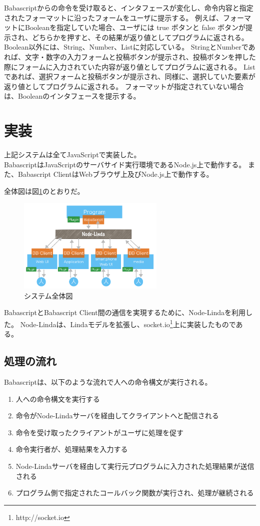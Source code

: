 \documentclass[twoside]{wiss}
\begin{document}
Babascriptからの命令を受け取ると、インタフェースが変化し、命令内容と指定されたフォーマットに沿ったフォームをユーザに提示する。
例えば、フォーマットにBooleanを指定していた場合、ユーザには true ボタンと false ボタンが提示され、どちらかを押すと、その結果が返り値としてプログラムに返される。
Boolean以外には、String、Number、Listに対応している。
StringとNumberであれば、文字・数字の入力フォームと投稿ボタンが提示され、投稿ボタンを押した際にフォームに入力されていた内容が返り値としてプログラムに返される。
Listであれば、選択フォームと投稿ボタンが提示され、同様に、選択していた要素が返り値としてプログラムに返される。
フォーマットが指定されていない場合は、Booleanのインタフェースを提示する。

\section{実装}

上記システムは全てJavaScriptで実装した。\\
BabascriptはJavaScriptのサーバサイド実行環境であるNode.js上で動作する。
また、Babascript ClientはWebブラウザ上及びNode.js上で動作する。

全体図は図\ref{system}のとおりだ。

\begin{figure}[h]
  \includegraphics[width=70mm, bb=0 0 928 599]{./images/system.png}
  \caption{システム全体図}  
  \label{system}
\end{figure}

BabascriptとBabascript Client間の通信を実現するために、Node-Linda\cite{nodelinda}を利用した。
Node-Lindaは、Linda\cite{linda}モデルを拡張し、socket.io\footnote{http://socket.io}上に実装したものである。

\subsection{処理の流れ}

Babascriptは、以下のような流れで人への命令構文が実行される。

\begin{enumerate}
  \item 人への命令構文を実行する
  \item 命令がNode-Lindaサーバを経由してクライアントへと配信される
  \item 命令を受け取ったクライアントがユーザに処理を促す
  \item 命令実行者が、処理結果を入力する
  \item Node-Lindaサーバを経由して実行元プログラムに入力された処理結果が送信される
  \item プログラム側で指定されたコールバック関数が実行され、処理が継続される
\end{enumerate}
\end{document}
